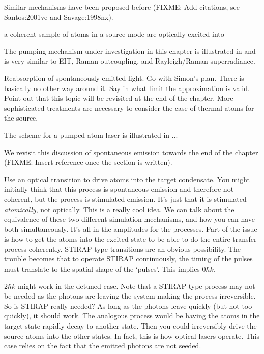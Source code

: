 Similar mechanisms have been proposed before (FIXME: Add citations, see Santos:2001ve and Savage:1998nx).

a coherent sample of atoms in a source mode are optically excited into 


The pumping mechanism under investigation in this chapter is illustrated in  and is very similar to EIT, Raman outcoupling, and Rayleigh/Raman superradiance.  


Reabsorption of spontaneously emitted light.  Go with Simon's plan.  There is basically no other way around it.  Say in what limit the approximation is valid.  Point out that this topic will be revisited at the end of the chapter.  More sophisticated treatments are necessary to consider the case of thermal atoms for the source. 


The scheme for a pumped atom laser is illustrated in ...





We revisit this discussion of spontaneous emission towards the end of the chapter (FIXME: Insert reference once the section is written).


Use an optical transition to drive atoms into the target condensate.  You might initially think that this process is spontaneous emission and therefore not coherent, but the process is stimulated emission.  It's just that it is stimulated \emph{atomically}, not optically.  This is a really cool idea.  We can talk about the equivalence of these two different simulation mechanisms, and how you can have both simultaneously.  It's all in the amplitudes for the processes.  Part of the issue is how to get the atoms into the excited state to be able to do the entire transfer process coherently.  STIRAP-type transitions are an obvious possibility.  The trouble becomes that to operate STIRAP continuously, the timing of the pulses must translate to the spatial shape of the `pulses'.  This implies $0 \hbar k$.

$2 \hbar k$ might work in the detuned case.  Note that a STIRAP-type process may not be needed as the photons are leaving the system making the process irreversible.  So is STIRAP really needed? As long as the photons leave quickly (but not too quickly), it should work.  The analogous process would be having the atoms in the target state rapidly decay to another state. Then you could irreversibly drive the source atoms into the other states.  In fact, this is how optical lasers operate.  This case relies on the fact that the emitted photons are not seeded.

